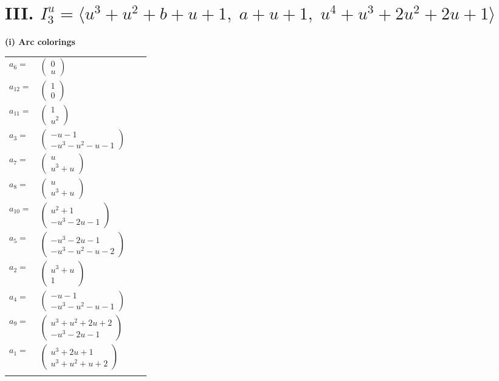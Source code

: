 \documentclass[1p]{elsarticle_modified}
\theoremstyle{definition}
\begin{document}
\centering \section*{III. $I^u_{3}= \langle u^3+u^2+b+u+1,\;a+u+1,\;u^4+u^3+2 u^2+2 u+1 \rangle$}
\flushleft \textbf{(i) Arc colorings}\\
\begin{tabular}{m{7pt} m{180pt} m{7pt} m{180pt} }
\flushright $a_{6}=$&$\begin{pmatrix}0\\u\end{pmatrix}$ \\
\flushright $a_{12}=$&$\begin{pmatrix}1\\0\end{pmatrix}$ \\
\flushright $a_{11}=$&$\begin{pmatrix}1\\u^2\end{pmatrix}$ \\
\flushright $a_{3}=$&$\begin{pmatrix}- u-1\\- u^3- u^2- u-1\end{pmatrix}$ \\
\flushright $a_{7}=$&$\begin{pmatrix}u\\u^3+u\end{pmatrix}$ \\
\flushright $a_{8}=$&$\begin{pmatrix}u\\u^3+u\end{pmatrix}$ \\
\flushright $a_{10}=$&$\begin{pmatrix}u^2+1\\- u^3-2 u-1\end{pmatrix}$ \\
\flushright $a_{5}=$&$\begin{pmatrix}- u^3-2 u-1\\- u^3- u^2- u-2\end{pmatrix}$ \\
\flushright $a_{2}=$&$\begin{pmatrix}u^3+u\\1\end{pmatrix}$ \\
\flushright $a_{4}=$&$\begin{pmatrix}- u-1\\- u^3- u^2- u-1\end{pmatrix}$ \\
\flushright $a_{9}=$&$\begin{pmatrix}u^3+u^2+2 u+2\\- u^3-2 u-1\end{pmatrix}$ \\
\flushright $a_{1}=$&$\begin{pmatrix}u^3+2 u+1\\u^3+u^2+u+2\end{pmatrix}$\\&\end{tabular}
\end{document}

